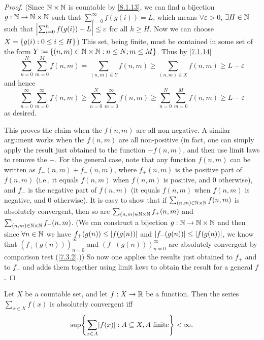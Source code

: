 \begin{proof}
  (Since \(\mathbb{N} \times \mathbb{N}\) is countable by \cref{8.1.13}, we can find a bijection \(g : \mathbb{N} \to \mathbb{N} \times \mathbb{N}\) such that \(\sum_{i = 0}^\infty f(g(i)) = L\), which means \(\forall \varepsilon > 0\), \(\exists H \in \mathbb{N}\) such that \(\left\lvert\sum_{i = 0}^h f(g(i)) - L\right\rvert \leq \varepsilon\) for all \(h \geq H\).
  Now we can choose \(X = \left\lbrace g(i) : 0 \leq i \leq H\right\rbrace\))
  This set, being finite, must be contained in some set of the form \(Y \coloneqq \left\lbrace(n,m) \in \mathbb{N} \times \mathbb{N} : n \leq N; m \leq M \right\rbrace\).
  Thus by \cref{7.1.14}
  \[
    \sum_{n = 0}^N \sum_{m = 0}^M f(n, m) = \sum_{(n, m) \in Y} f(n, m) \geq \sum_{(n, m) \in X} f(n, m) \geq L - \varepsilon
  \]
  and hence
  \[
    \sum_{n = 0}^\infty \sum_{m = 0}^\infty f(n, m) \geq \sum_{n = 0}^N \sum_{m = 0}^\infty f(n, m) \geq \sum_{n = 0}^N \sum_{m = 0}^M f(n, m) \geq L - \varepsilon
  \]
  as desired.

  This proves the claim when the \(f(n, m)\) are all non-negative.
  A similar argument works when the \(f(n, m)\) are all non-positive
  (in fact, one can simply apply the result just obtained to the function \(-f(n, m)\), and then use limit laws to remove the \(-\).
  For the general case, note that any function \(f(n, m)\) can be written as \(f_+(n, m) + f_-(n, m)\), where \(f_+(n, m)\) is the positive part of \(f(n, m)\)
  (i.e., it equals \(f(n, m)\) when \(f(n, m)\) is positive, and \(0\) otherwise),
  and \(f_-\) is the negative part of \(f(n, m)\)
  (it equals \(f(n, m)\) when \(f(n, m)\) is negative, and \(0\) otherwise).
  It is easy to show that if \(\sum_{(n, m) \in \mathbb{N} \times \mathbb{N}} f(n, m)\) is absolutely convergent, then so are \(\sum_{(n, m) \in \mathbb{N} \times \mathbb{N}} f_+(n, m)\) and \(\sum_{(n, m) \in \mathbb{N} \times \mathbb{N}} f_-(n, m)\).
  (We can construct a bijection \(g : \mathbb{N} \to \mathbb{N} \times \mathbb{N}\) and then since \(\forall n \in \mathbb{N}\) we have \(f_+(g(n)) \leq \left\lvert f(g(n))\right\rvert\) and \(\left\lvert f_-(g(n))\right\rvert \leq \left\lvert f(g(n))\right\rvert\), we know that \((f_+(g(n)))_{n = 0}^\infty\) and \((f_-(g(n)))_{n = 0}^\infty\) are absolutely convergent by comparison test (\cref{7.3.2}.))
  So now one applies the results just obtained to \(f_+\) and to \(f_-\) and adds them together using limit laws to obtain the result for a general \(f\).
\end{proof}

\begin{lem}\label{8.2.3}
  Let \(X\) be a countable set, and let \(f : X \to \mathbb{R}\) be a function.
  Then the series \(\sum_{x \in X} f(x)\) is absolutely convergent iff
  \[
    \sup\set{\sum_{x \in A} \abs{f(x)} : A \subseteq X, A \text{ finite}} < \infty.
  \]
\end{lem}

